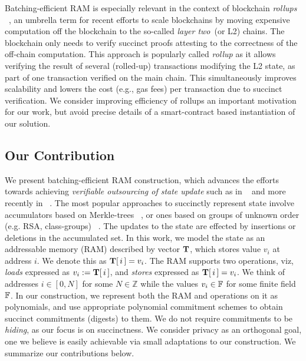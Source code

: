  Batching-efficient RAM is especially relevant in the context of blockchain {\em rollups} ~\cite{rollup},
an umbrella term for recent efforts to scale blockchains by moving expensive computation off the blockchain to the so-called {\em layer two}~(or L2) chains. The blockchain only needs to verify succinct proofs attesting to the correctness of the off-chain computation. This approach is popularly called \textit{rollup} as it allows verifying the result of several (rolled-up) transactions modifying the L2 state, as part of one transaction verified on the main chain.
This simultaneously improves scalability and lowers the cost (e.g., gas fees) per transaction due to succinct verification. We consider improving efficiency of rollups an important motivation for our work, but avoid precise details of a smart-contract based
instantiation of our solution.

\subsection{Our Contribution}\label{subsec:ourwork} 
We present batching-efficient RAM construction, which advances the efforts
towards achieving {\em verifiable outsourcing of state update} such as in ~\cite{EPRINT:BFRSBW13}
and more recently in ~\cite{USENIX:OWWB20, CCS:CFHKKO22}.
The most popular approaches to succinctly represent
state involve accumulators based on Merkle-trees ~\cite{C:Merkle87}, or ones based on groups of unknown order
(e.g. RSA, class-groups) ~\cite{C:CamLys02,C:BonBunFis19,USENIX:OWWB20, CCS:CFHKKO22}.
The updates to the state are effected by insertions or deletions in the  accumulated set.
In this work, we
model the state as an addressable memory (RAM) described by vector $\mathbf{T}$, which stores value $v_i$ at address $i$.
We denote this as $\mathbf{T}[\,i\,]=v_i$. The RAM supports two operations, viz, {\em loads} expressed
as $v_i := \mathbf{T}[\,i\,]$, and {\em stores} expressed as $\mathbf{T}[\,i\,]=v_i$.
We think of addresses $i\in [0,N]$ for some $N\in \mathbb{Z}$ while the
values $v_i\in \mathbb{F}$ for some finite field $\mathbb{F}$. In our construction, we represent both the RAM and operations on it
as polynomials, and use appropriate polynomial commitment schemes to obtain succinct commitments (digests) to them.
We do not require commitments to be {\em hiding}, as our focus is on succinctness.
We consider privacy as an orthogonal goal, one we believe is easily achievable
via small adaptations to our construction. We summarize our contributions below.



